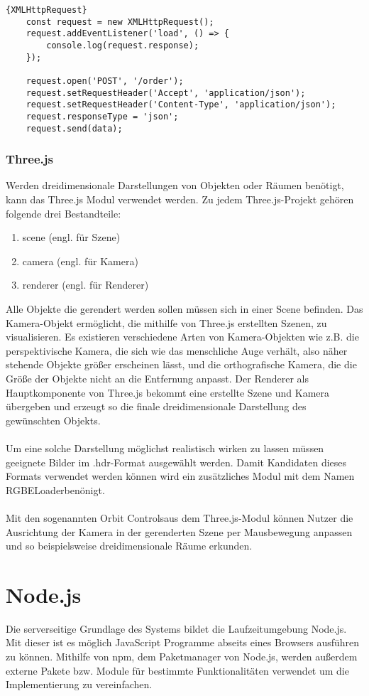 \begin{lstlisting}{XMLHttpRequest}
	const request = new XMLHttpRequest();
	request.addEventListener('load', () => {
		console.log(request.response);
	});

    request.open('POST', '/order');
    request.setRequestHeader('Accept', 'application/json');
    request.setRequestHeader('Content-Type', 'application/json');
    request.responseType = 'json';
    request.send(data);
\end{lstlisting}


\subsubsection{Three.js}
Werden dreidimensionale Darstellungen von Objekten oder Räumen benötigt, kann das Three.js Modul verwendet werden.
Zu jedem Three.js-Projekt gehören folgende drei Bestandteile:
\begin{enumerate}
	\item scene (engl. für Szene)
	\item camera (engl. für Kamera)
	\item renderer (engl. für Renderer)
\end{enumerate}
Alle Objekte die gerendert werden sollen müssen sich in einer Scene befinden. Das Kamera-Objekt ermöglicht, die mithilfe von Three.js erstellten Szenen, zu visualisieren. Es existieren verschiedene Arten von Kamera-Objekten wie z.B. die perspektivische Kamera, die sich wie das menschliche Auge verhält, also näher stehende Objekte größer erscheinen lässt, und die orthografische Kamera, die die Größe der Objekte nicht an die Entfernung anpasst. Der Renderer als Hauptkomponente von Three.js bekommt eine erstellte Szene und Kamera übergeben und erzeugt so die finale dreidimensionale Darstellung des gewünschten Objekts.
\\
\\
Um eine solche Darstellung möglichst realistisch wirken zu lassen müssen geeignete Bilder im \glqq .hdr\grqq -Format ausgewählt werden. Damit Kandidaten dieses Formats verwendet werden können wird ein zusätzliches Modul mit dem Namen \glqq RGBELoader\grqq benönigt. 
\\
\\
Mit den sogenannten \glqq Orbit Controls\grqq \thinspace aus dem Three.js-Modul können Nutzer die Ausrichtung der Kamera in der gerenderten Szene per Mausbewegung anpassen und so beispielsweise dreidimensionale Räume erkunden.

\section{Node.js}
Die serverseitige Grundlage des Systems bildet die Laufzeitumgebung Node.js. Mit dieser ist es möglich JavaScript Programme abseits eines Browsers ausführen zu können. Mithilfe von \glqq npm\grqq, dem Paketmanager von Node.js, werden außerdem externe Pakete bzw. Module für bestimmte Funktionalitäten verwendet um die Implementierung zu vereinfachen.

